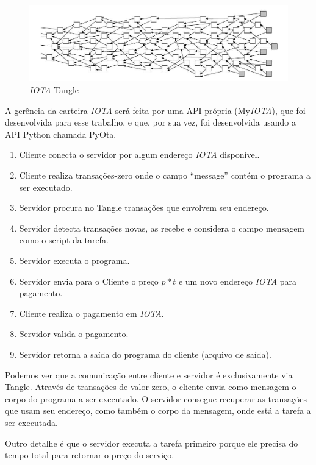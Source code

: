 \documentclass[a4paper]{article}
\begin{document}
\begin{figure}[!htb]
\centering
\includegraphics[scale=0.4]{tangle.jpg}
\caption{\textit{IOTA} Tangle}
\label{fig:tangle}
\end{figure}

A gerência da carteira \textit{IOTA} será feita por uma API própria (My\textit{IOTA}), que foi desenvolvida para esse trabalho, e que, por sua vez, foi
desenvolvida usando a API Python chamada PyOta.

\begin{enumerate}
\item Cliente conecta o servidor por algum endereço \textit{IOTA} disponível.
\item Cliente realiza transações-zero onde o campo ``message'' contém o programa a ser executado.
\item Servidor procura no Tangle transações que envolvem seu endereço.
\item Servidor detecta transações novas, as recebe e considera o campo mensagem como o script da tarefa.
\item Servidor executa o programa.
\item Servidor envia para o Cliente o preço $p*t$ e um novo endereço \textit{IOTA} para pagamento.
\item Cliente realiza o pagamento em \textit{IOTA}.
\item Servidor valida o pagamento.
\item Servidor retorna a saída do programa do cliente (arquivo de saída).
\end{enumerate}

Podemos ver que a comunicação entre cliente e servidor é exclusivamente via Tangle. Através de transações de valor zero, o cliente
envia como mensagem o corpo do programa a ser executado. O servidor consegue recuperar as transações que usam seu endereço, como
também o corpo da mensagem, onde está a tarefa a ser executada.

Outro detalhe é que o servidor executa a tarefa primeiro porque ele precisa do tempo total para retornar o preço do serviço.
\end{document}
